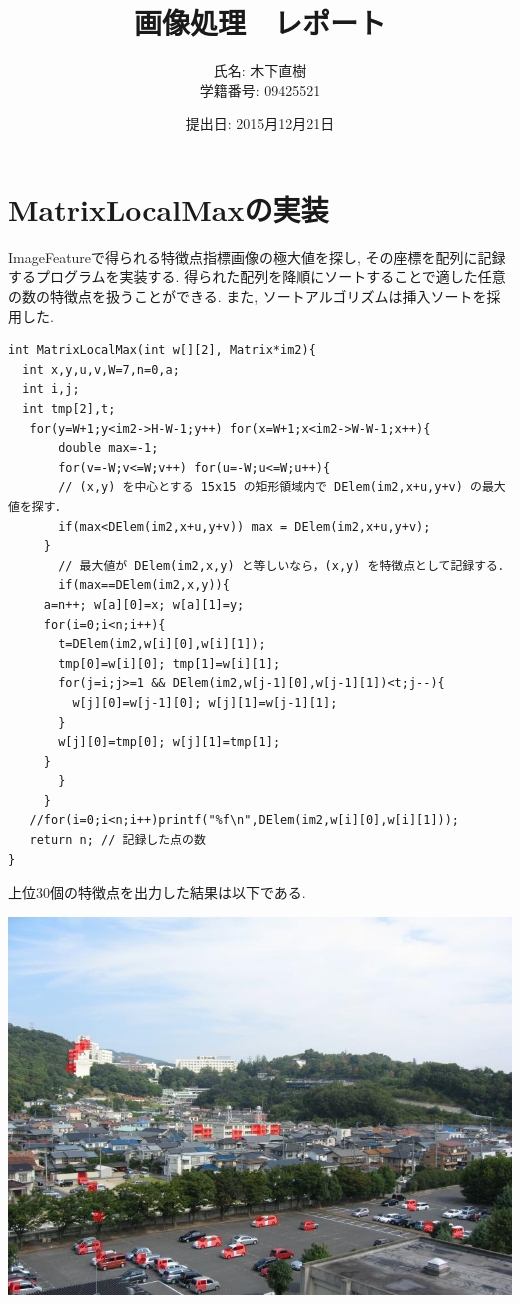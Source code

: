 \documentclass[a4j]{jarticle}
\title{画像処理　レポート}
\author{氏名: 木下直樹\\学籍番号: 09425521}
\date{提出日: 2015月12月21日}
\begin{document}
\maketitle

\section{MatrixLocalMaxの実装}
ImageFeatureで得られる特徴点指標画像の極大値を探し, その座標を配列に記録するプログラムを実装する. 
得られた配列を降順にソートすることで適した任意の数の特徴点を扱うことができる. 
また, ソートアルゴリズムは挿入ソートを採用した. 

\begin{verbatim}
int MatrixLocalMax(int w[][2], Matrix*im2){
  int x,y,u,v,W=7,n=0,a;
  int i,j;
  int tmp[2],t;
   for(y=W+1;y<im2->H-W-1;y++) for(x=W+1;x<im2->W-W-1;x++){
       double max=-1;
       for(v=-W;v<=W;v++) for(u=-W;u<=W;u++){
	   // (x,y) を中心とする 15x15 の矩形領域内で DElem(im2,x+u,y+v) の最大値を探す．
	   if(max<DElem(im2,x+u,y+v)) max = DElem(im2,x+u,y+v);
	 }
       // 最大値が DElem(im2,x,y) と等しいなら，(x,y) を特徴点として記録する．
       if(max==DElem(im2,x,y)){
	 a=n++; w[a][0]=x; w[a][1]=y;
	 for(i=0;i<n;i++){
	   t=DElem(im2,w[i][0],w[i][1]);
	   tmp[0]=w[i][0]; tmp[1]=w[i][1];
	   for(j=i;j>=1 && DElem(im2,w[j-1][0],w[j-1][1])<t;j--){
	     w[j][0]=w[j-1][0]; w[j][1]=w[j-1][1];
	   }
	   w[j][0]=tmp[0]; w[j][1]=tmp[1];
	 }
       }
     }
   //for(i=0;i<n;i++)printf("%f\n",DElem(im2,w[i][0],w[i][1]));
   return n; // 記録した点の数
}
\end{verbatim}
上位30個の特徴点を出力した結果は以下である. 

\includegraphics[bb=0 0 768 576,scale=.35]{out2.jpg}
\end{document}
